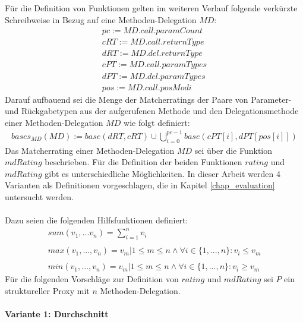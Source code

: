 \\\\
Für die Definition von Funktionen gelten im weiteren Verlauf folgende verkürzte Schreibweise in Bezug auf eine Methoden-Delegation $\mathit{MD}$:
\begin{gather*}
	\mathit{pc} := \mathit{MD.call.paramCount}
	\\
	\mathit{cRT} := \mathit{MD.call.returnType}
	\\
	\mathit{dRT} := \mathit{MD.del.returnType}
	\\
	\mathit{cPT} := \mathit{MD.call.paramTypes}
	\\
	\mathit{dPT} := \mathit{MD.del.paramTypes}
	\\
	\mathit{pos} := \mathit{MD.call.posModi}
\end{gather*}
\noindent
Darauf aufbauend sei die Menge der Matcherratings der Paare von Parameter- und Rückgabetypen aus der aufgerufenen Methode und den Delegationsmethode einer Methoden-Delegation $\mathit{MD}$ wie folgt definiert:
\begin{gather*}
\mathit{bases_{MD}(MD)} :=  \mathit{base(dRT, cRT)} \cup \bigcup\limits_{i=0}^{pc-1} \mathit{base(cPT[i],dPT[pos[i]])}
\end{gather*}
\noindent
Das Matcherrating einer Methoden-Delegation $\mathit{MD}$ sei über die Funktion $\mathit{mdRating}$ beschrieben. Für die Definition der beiden Funktionen $\mathit{rating}$ und $\mathit{mdRating}$ gibt es unterschiedliche Möglichkeiten. In dieser Arbeit werden 4 Varianten als Definitionen vorgeschlagen, die in Kapitel \ref{chap_evaluation} untersucht werden.
\\\\
Dazu seien die folgenden Hilfsfunktionen definiert:
\begin{gather*}    
\mathit{sum(v_1,...v_n)} = \sum_{i=1}^{n}v_i
\\\\
\mathit{max(v_1,...,v_n)} = v_{m}| 1 \leq m \leq n  \wedge \forall i \in  \{1,...,n\}: v_i \leq v_{m}
\\\\       
\mathit{min(v_1,...,v_n)} = v_{m}| 1 \leq m \leq n  \wedge \forall i \in  \{1,...,n\}: v_i \geq v_{m}   
\end{gather*}
Für die folgenden Vorschläge zur Definition von $\mathit{rating}$ und $\mathit{mdRating}$ sei $P$ ein struktureller Proxy mit $n$ Methoden-Delegation.
\paragraph{Variante 1: Durchschnitt}


